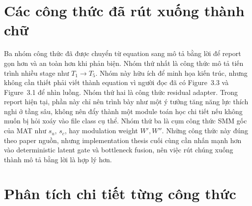 \documentclass[12pt,a4paper]{article}
\begin{document}
\section{Các công thức đã rút xuống thành chữ}

Ba nhóm công thức đã được chuyển từ equation sang mô tả bằng lời để report gọn hơn và an toàn hơn khi phản biện. Nhóm thứ nhất là công thức mô tả tiến trình nhiều stage như $T_1 \rightarrow T_5$. Nhóm này hữu ích để minh họa kiến trúc, nhưng không cần thiết phải viết thành equation vì người đọc đã có Figure~3.3 và Figure~3.1 để nhìn luồng. Nhóm thứ hai là công thức residual adapter. Trong report hiện tại, phần này chỉ nên trình bày như một ý tưởng tăng năng lực thích nghi ở tầng sâu, không nên đẩy thành một module toán học chi tiết nếu không muốn bị hỏi xoáy vào file class cụ thể. Nhóm thứ ba là cụm công thức SMM gốc của MAT như $s_u$, $s_c$, hay modulation weight $W', W''$. Những công thức này đúng theo paper nguồn, nhưng implementation thesis cuối cùng cần nhấn mạnh hơn vào deterministic latent gate và bottleneck fusion, nên việc rút chúng xuống thành mô tả bằng lời là hợp lý hơn.

\section{Phân tích chi tiết từng công thức}
\end{document}
